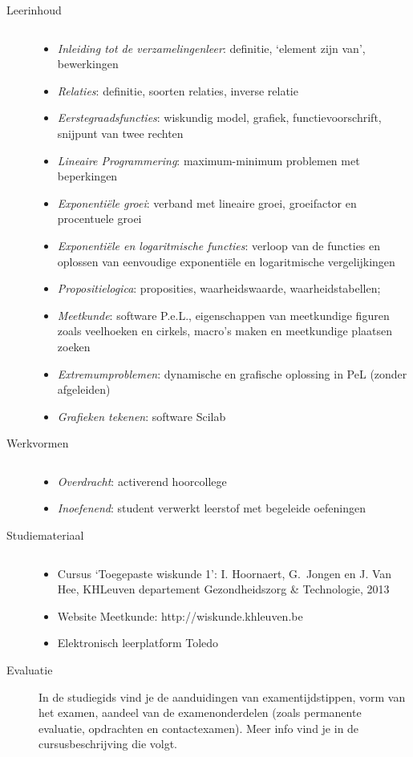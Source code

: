 \begin{description}
\item [Leerinhoud]$\qquad$

\begin{itemize}
\item \emph{Inleiding tot de verzamelingenleer}: definitie, `element zijn van', bewerkingen
\item \emph{Relaties}: definitie, soorten relaties, inverse relatie
\item \emph{Eerstegraadsfuncties}: wiskundig model, grafiek, functievoorschrift, snijpunt van twee rechten
\item \emph{Lineaire Programmering}: maximum-minimum problemen met beperkingen
\item \emph{Exponenti\"{e}le groei}: verband met lineaire groei, groeifactor en procentuele groei
\item \emph{Exponenti\"{e}le en logaritmische functies}: verloop van de functies en oplossen van eenvoudige exponenti\"{e}le en logaritmische vergelijkingen
\item \emph{Propositielogica}: proposities, waarheidswaarde, waarheidstabellen;
\item \emph{Meetkunde}: software P.e.L., eigenschappen van meetkundige figuren zoals veelhoeken en  cirkels, macro's maken en meetkundige plaatsen zoeken
\item \emph{Extremumproblemen}:  dynamische en grafische oplossing in PeL (zonder afgeleiden) 
\item \emph{Grafieken tekenen}: software Scilab
\end{itemize}

\item [Werkvormen]$\qquad$

\begin{itemize}
\item \emph{Overdracht}: activerend hoorcollege
\item \emph{Inoefenend}: student verwerkt leerstof met begeleide oefeningen

\end{itemize}



\item [Studiemateriaal]	$\qquad$

\begin{itemize}
\item Cursus `Toegepaste wiskunde 1': I. Hoornaert, G.~Jongen en J. Van Hee,  KHLeuven departement Gezondheidszorg \& Technologie, 2013
\item Website Meetkunde: http://wiskunde.khleuven.be 
\item Elektronisch leerplatform Toledo 
\end{itemize}

\item [Evaluatie]	In de studiegids vind je de aanduidingen van examentijdstippen, vorm van het examen, aandeel van de examenonderdelen (zoals permanente evaluatie, opdrachten en contactexamen).   Meer info vind je in de cursusbeschrijving die volgt.

\end{description}

